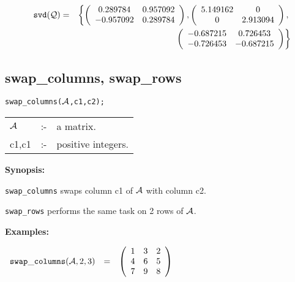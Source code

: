\begin{eqnarray}
\hspace*{0.1in}
{\tt svd({\cal Q})} & = & 
\left\{ 
        \left( \begin{array}{cc} 0.289784 & 0.957092 \\ -0.957092 & 
0.289784 \end{array} \right), \left( \begin{array}{cc} 5.149162 & 0 \\ 
0 & 2.913094 \end{array} \right), \right. \nonumber \\ & & \left. \: \; 
\, \left( \begin{array}{cc} -0.687215 & 0.726453 \\ -0.726453 & 
-0.687215 \end{array} \right)       
\right\} \nonumber
\end{eqnarray}


\subsection{swap\_columns, swap\_rows}


\hspace*{0.175in} {\tt swap\_columns(${\cal A}$,c1,c2);}

\hspace*{0.1in} 
\begin{tabular}{l l l}
${\cal A}$ &:-& a matrix. \\
c1,c1      &:-& positive integers. 
\end{tabular}

{\bf Synopsis:} %

\hspace*{0.175in} 
{\tt swap\_columns} swaps column c1 of ${\cal A}$ with column c2. 

\hspace*{0.175in} {\tt swap\_rows} performs the same task on 2 rows of 
                ${\cal A}$.

{\bf Examples:}

\begin{flushleft}  
\hspace*{0.1in}
\begin{math}  
\begin{array}{ccc}
{\tt swap\_columns}({\cal A},2,3) & = & 
        \left( \begin{array}{ccc} 1 & 3 & 2 \\ 4 & 6 & 5 \\ 7 & 9 & 8
 \end{array} \right) 
\end{array}
\end{math}  
\end{flushleft}

